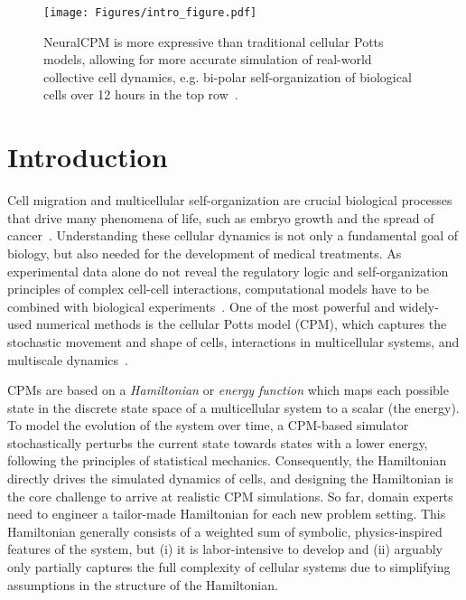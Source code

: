 
\begin{figure}[t]
    \centering
    \texttt{[image: Figures/intro\_figure.pdf]}
    \caption{NeuralCPM is more expressive than traditional cellular Potts models, allowing for more accurate simulation of real-world collective cell dynamics, e.g. bi-polar self-organization of biological cells over 12 hours in the top row~\cite{Toda2018Science}.}
    \label{fig:intro-figure}
\end{figure}


\section{Introduction}
\label{sec:introduction}

Cell migration and multicellular self-organization are crucial biological processes that drive many phenomena of life, such as embryo growth and the spread of cancer~\cite{friedlCollectiveCellMigration2009,Gottheil2023}. Understanding these cellular dynamics is not only a fundamental goal of biology, but also needed for the development of medical treatments. 
As experimental data alone do not reveal the regulatory logic and self-organization principles of complex cell-cell interactions, computational models have to be combined with biological experiments~\cite{Maree2001PNAS,Hester2011PLOS,Boutillon2022}. 
One of the most powerful and widely-used numerical methods is the cellular Potts model (CPM), which captures the stochastic movement and shape of cells, interactions in multicellular systems, and multiscale dynamics~\cite{Graner1992, Balter2007}.

CPMs are based on a \emph{Hamiltonian} or \emph{energy function} which maps each possible state in the discrete state space of a multicellular system to a scalar (the energy). To model the evolution of the system over time, a CPM-based simulator stochastically perturbs the current state towards states with a lower energy, following the principles of statistical mechanics. Consequently, the Hamiltonian directly drives the simulated dynamics of cells, and designing the Hamiltonian is the core challenge to arrive at realistic CPM simulations.
So far, domain experts need to engineer a tailor-made Hamiltonian for each new problem setting. This Hamiltonian generally consists of a weighted sum of symbolic, physics-inspired features of the system, but (i) it is labor-intensive to develop and (ii) arguably only partially captures the full complexity of cellular systems due to simplifying assumptions in the structure of the Hamiltonian. 

